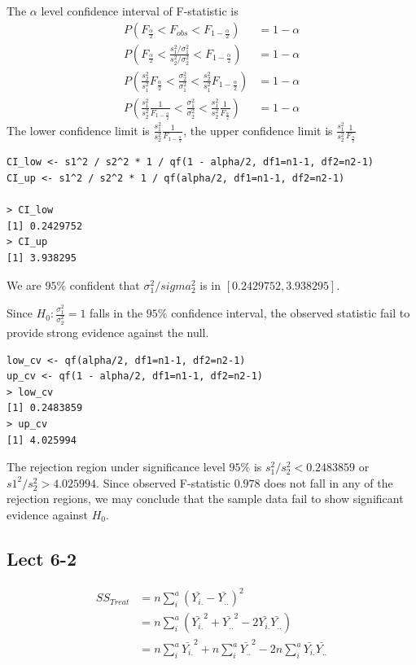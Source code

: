 \documentclass[11pt,letterpaper]{article}
\begin{document}
The $\alpha$ level confidence interval of F-statistic is 
\begin{align*}
P (F_{\frac{\alpha}{2}} < F_{obs} < F_{1 - \frac{\alpha}{2}}) &= 1 - \alpha \\
P (F_{\frac{\alpha}{2}} < \frac{s_1^2 / \sigma_1^2}{s_2^2 / \sigma_2^2} < F_{1 - \frac{\alpha}{2}}) &= 1 - \alpha \\
P (\frac{s_2^2}{s_1^2} F_{\frac{\alpha}{2}} < \frac{\sigma_2^2}{\sigma_1^2} < \frac{s_2^2}{s_1^2} F_{1-\frac{\alpha}{2}} ) &= 1 - \alpha \\
P (\frac{s_1^2}{s_2^2} \frac{1}{F_{1 - \frac{\alpha}{2}}} < \frac{\sigma_1^2}{\sigma_2^2} < \frac{s_1^2}{s_2^2} \frac{1}{F_{ \frac{\alpha}{2}}} ) &= 1 - \alpha
\end{align*}
\noindent The lower confidence limit is $\frac{s_1^2}{s_2^2} \frac{1}{F_{1 - \frac{\alpha}{2}}}$, the upper confidence limit is $\frac{s_1^2}{s_2^2} \frac{1}{F_{ \frac{\alpha}{2}}}$
\begin{verbatim}
CI_low <- s1^2 / s2^2 * 1 / qf(1 - alpha/2, df1=n1-1, df2=n2-1)
CI_up <- s1^2 / s2^2 * 1 / qf(alpha/2, df1=n1-1, df2=n2-1)

> CI_low
[1] 0.2429752
> CI_up
[1] 3.938295
\end{verbatim}
\noindent We are $95 \%$ confident that $\sigma_1^2 / sigma_2^2$ is in $[0.2429752, 3.938295]$. 

\noindent Since $H_0: \frac{\sigma_1^2}{\sigma_2^2} = 1$ falls in the $95 \%$ confidence interval, the observed statistic fail to provide strong evidence against the null. 

\begin{verbatim}
low_cv <- qf(alpha/2, df1=n1-1, df2=n2-1)
up_cv <- qf(1 - alpha/2, df1=n1-1, df2=n2-1)
> low_cv
[1] 0.2483859
> up_cv
[1] 4.025994
\end{verbatim}
\noindent The rejection region under significance level $95 \%$ is $s_1^2 / s_2^2 < 0.2483859$ or $s1^2 / s_2^2 >4.025994 $. Since observed F-statistic $0.978$ does not fall in any of the rejection regions, we may conclude that the sample data fail to show significant evidence against $H_0$.


\subsection*{Lect 6-2}
\begin{align*}
SS_{Treat} &= n \sum_{i}^a (\bar{Y_{i.}} - \bar{Y_{..}})^2 \\
&= n \sum_{i}^a (\bar{Y_{i.}}^2 + \bar{Y_{..}}^2 - 2 \bar{Y_{i.}} \bar{Y_{..}}) \\
&=  n \sum_{i}^a \bar{Y_{i.}}^2 + n \sum_{i}^a \bar{Y_{..}}^2 - 2 n \sum_{i}^a\bar{Y_{i.}} \bar{Y_{..}} 
\end{align*}
\end{document}
